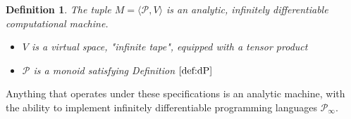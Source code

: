 \documentclass{article}
\newcommand{\dP}{\mathcal{P}}
\newtheorem{definicija}{Definition}[section]
\begin{document}
\begin{definicija}
   The tuple $M=\langle\dP, V\rangle$ is an analytic, infinitely  differentiable computational machine.
   
    \begin{itemize}
    \item
    $V$ is a virtual space, "infinite tape", equipped with a tensor product
    \item
    $\dP$ is a monoid satisfying Definition $\ref{def:dP}$
    \end{itemize}
  \end{definicija}
  Anything that operates under these specifications is an analytic machine, with the ability to implement infinitely differentiable programming languages $\dP_\infty$.
  
  \printbibliography
\end{document}
